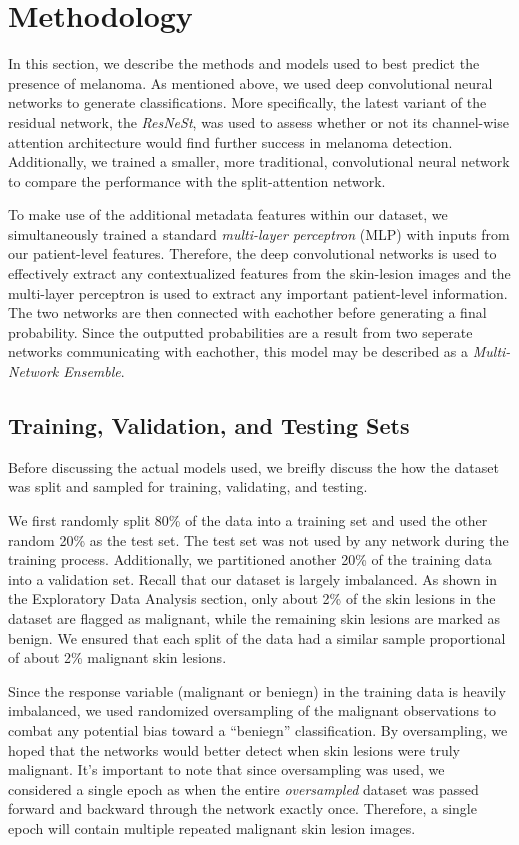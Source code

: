 \documentclass [MAS] {uclathes}
\begin{document}
\chapter{Methodology}

In this section, we describe the methods and models used to best predict the presence of melanoma. As mentioned above, we used deep convolutional neural networks to generate classifications. More specifically, the latest variant of the residual network, the \textit{ResNeSt}, was used to assess whether or not its channel-wise attention architecture would find further success in melanoma detection. Additionally, we trained a smaller, more traditional, convolutional neural network to compare the performance with the split-attention network. 

To make use of the additional metadata features within our dataset, we simultaneously trained a standard \textit{multi-layer perceptron} (MLP) with inputs from our patient-level features. Therefore, the deep convolutional networks is used to effectively extract any contextualized features from the skin-lesion images and the multi-layer perceptron is used to extract any important patient-level information. The two networks are then connected with eachother before generating a final probability. Since the outputted probabilities are a result from two seperate networks communicating with eachother, this model may be described as a \textit{Multi-Network Ensemble}.

\section{Training, Validation, and Testing Sets}

Before discussing the actual models used, we breifly discuss the how the dataset was split and sampled for training, validating, and testing.

We first randomly split 80\% of the data into a training set and used the other random 20\% as the test set. The test set was
not used by any network during the training process. Additionally, we partitioned another 20\% of the training data into a validation set. Recall that our dataset is largely imbalanced. As shown in the Exploratory Data Analysis section, only about 2\% of the skin lesions in the dataset are flagged as malignant, while the remaining skin lesions are marked as benign. We ensured that each split of the data had a similar sample proportional of about 2\% malignant skin lesions.

Since the response variable (malignant or beniegn) in the training data is heavily imbalanced, we used randomized oversampling of the malignant observations to combat any potential bias toward a ``beniegn'' classification. By oversampling, we hoped that the networks would better detect when skin lesions were truly malignant. It's important to note that since oversampling was used, we considered a single epoch as when the entire \textit{oversampled} dataset was passed forward and backward through the network exactly once. Therefore, a single epoch will contain multiple repeated malignant skin lesion images.
\end{document}
